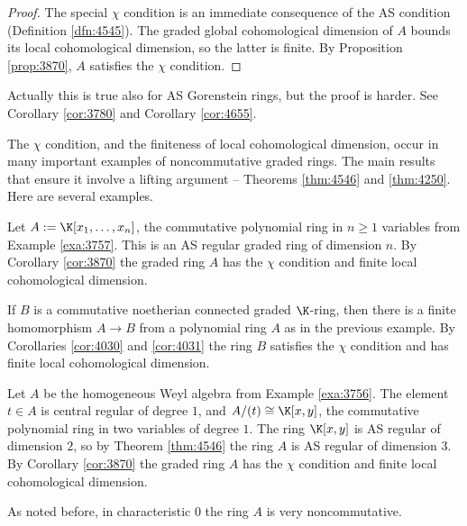 \begin{proof}
The special $\chi$ condition is an immediate consequence of the AS condition
(Definition \ref{dfn:4545}). 
The graded global cohomological dimension of $A$ bounds its local cohomological 
dimension, so the latter is finite.
By Proposition \ref{prop:3870}, $A$ satisfies the $\chi$ condition.
\end{proof}

Actually this is true also for AS Gorenstein rings, but the proof is harder. 
See Corollary \ref{cor:3780} and Corollary \ref{cor:4655}.

The $\chi$ condition, and the finiteness of local cohomological dimension, 
occur in many important examples of noncommutative graded rings. 
The main results that ensure it involve a lifting argument -- 
Theorems \ref{thm:4546} and \ref{thm:4250}.
Here are several examples. 

\begin{exa} \label{exa:4081}
Let $A := \K [x_1, \ldots, x_n]$, the commutative polynomial ring in 
$n \geq 1$ variables from Example \ref{exa:3757}. 
This is an AS regular graded ring of dimension $n$.
By Corollary \ref{cor:3870} the graded ring $A$ has the $\chi$ condition and 
finite local cohomological dimension.
\end{exa}

\begin{exa} \label{exa:4082}
If $B$ is a commutative noetherian connected graded $\K$-ring, then there is a 
finite homomorphism $A \to B$ from a polynomial ring $A$ as in the previous 
example. By Corollaries \ref{cor:4030} and \ref{cor:4031} the ring $B$ 
satisfies the $\chi$ condition and has finite local cohomological dimension.
\end{exa}

\begin{exa} \label{exa:4080}
Let $A$ be the homogeneous Weyl algebra from Example \ref{exa:3756}.
The element $t \in A$ is central regular of degree $1$, and 
$A / (t) \cong \K[x, y]$,
the commutative polynomial ring in two variables of degree $1$. 
The ring $\K[x, y]$ is AS regular of dimension $2$, so by Theorem 
\ref{thm:4546} the ring $A$ is AS regular of dimension $3$.
By Corollary \ref{cor:3870} the graded ring $A$ has the $\chi$ condition and 
finite local cohomological dimension.

As noted before, in characteristic $0$ the ring $A$ is very noncommutative. 
\end{exa}

